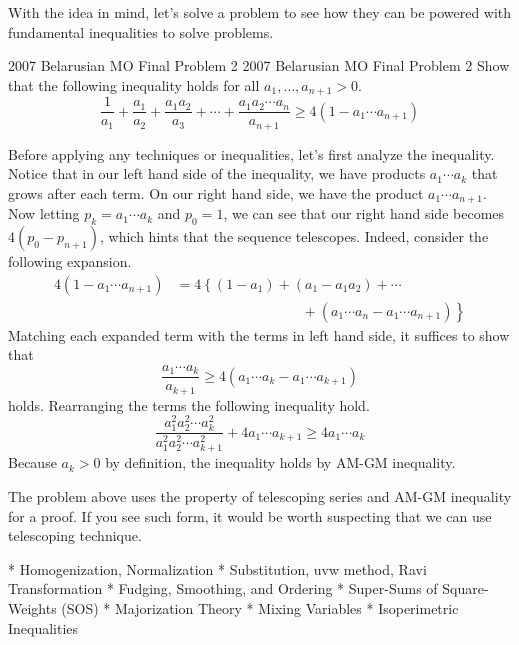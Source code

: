 \documentclass[../../../main.tex]{subfiles}
\begin{document}
With the idea in mind, let's solve a problem to see how they can
be powered with fundamental inequalities to solve problems.

\begin{problem}
{2007 Belarusian MO Final Problem 2 \easy}
{2007 Belarusian MO Final Problem 2}
Show that the following inequality holds for all $a_1, \ldots,
a_{n+1} > 0$.
\[
\frac{1}{a_1} + \frac{a_1}{a_2} + \frac{a_1 a_2}{a_3} + \cdots +
    \frac{a_1 a_2 \cdots a_n}{a_{n+1}}
\geq 4(1 - a_1 \cdots a_{n+1})
\]
\end{problem}
\begin{solution}
Before applying any techniques or inequalities, let's first analyze
the inequality. Notice that in our left hand side of the inequality,
we have products $a_1 \cdots a_k$ that grows after each term.
On our right hand side, we have the product $a_1 \cdots a_{n+1}$.
Now letting $p_k = a_1 \cdots a_k$ and $p_0 = 1$, we can see that
our right hand side becomes $4(p_0 - p_{n+1})$, which hints that
the sequence telescopes. Indeed, consider the following expansion.
\begin{align*}
    4(1 - a_1 \cdots a_{n+1})
    &= 4 \left\{ (1 - a_1) + (a_1 - a_1 a_2) + \cdots \right. \\
    &\qquad\qquad\qquad\qquad\quad+\left.
        (a_1 \cdots a_{n} - a_1 \cdots a_{n+1})
    \right\}
\end{align*}
Matching each expanded term with the terms in left hand side,
it suffices to show that
\[
\frac{a_1 \cdots a_k}{a_{k+1}}
\geq 4(a_1 \cdots a_k - a_1 \cdots a_{k+1})
\]
holds. Rearranging the terms the following inequality hold.
\[
\frac{a_1^2 a_2^2 \cdots a_k^2}{a_1^2 a_2^2 \cdots a_{k+1}^2}
    + 4 a_1 \cdots a_{k+1}
\geq 4 a_1 \cdots a_k
\]
Because $a_k > 0$ by definition, the inequality holds by AM-GM
inequality.
\end{solution}

The problem above uses the property of telescoping series and
AM-GM inequality for a proof. If you see such form, it would be worth
suspecting that we can use telescoping technique.







* Homogenization, Normalization
* Substitution, uvw method, Ravi Transformation
* Fudging, Smoothing, and Ordering
* Super-Sums of Square-Weights (SOS)
* Majorization Theory
* Mixing Variables
* Isoperimetric Inequalities
\end{document}

